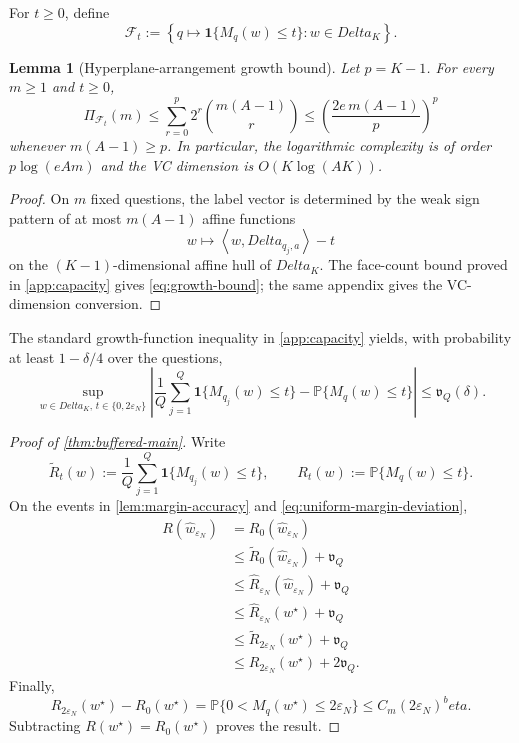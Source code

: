 \documentclass[11pt]{article}
\def\beta{beta}%
\def\Delta{Delta}%
\newtheorem{lemma}[theorem]{Lemma}
\newcommand{\Pp}{\mathbb P}
\newcommand{\one}{\mathbf 1}
\newcommand{\calF}{\mathcal F}
\newcommand{\eps}{\varepsilon}
\newcommand{\inner}[2]{\left\langle#1,#2\right\rangle}
\begin{document}
For $t\ge0$, define
\begin{equation}
\label{eq:margin-class}
\calF_t
:=
\left\{
q\mapsto\one\{M_q(w)\le t\}:w\in\Delta_K
\right\}.
\end{equation}

\begin{lemma}[Hyperplane-arrangement growth bound]
\label{lem:capacity}
Let $p=K-1$.  For every $m\ge1$ and $t\ge0$,
\begin{equation}
\label{eq:growth-bound}
\Pi_{\calF_t}(m)
\le
\sum_{r=0}^{p}2^r\binom{m(A-1)}{r}
\le
\left(\frac{2e\,m(A-1)}{p}\right)^p
\end{equation}
whenever $m(A-1)\ge p$.  In particular, the logarithmic complexity is of order $p\log(eAm)$ and the VC dimension is $O(K\log(AK))$.
\end{lemma}

\begin{proof}
On $m$ fixed questions, the label vector is determined by the weak sign pattern of at most $m(A-1)$ affine functions
\[
w\mapsto\inner{w}{\Delta_{q_j,a}}-t
\]
on the $(K-1)$-dimensional affine hull of $\Delta_K$.  The face-count bound proved in \cref{app:capacity} gives \eqref{eq:growth-bound}; the same appendix gives the VC-dimension conversion.
\end{proof}

The standard growth-function inequality in \cref{app:capacity} yields, with probability at least $1-\delta/4$ over the questions,
\begin{equation}
\label{eq:uniform-margin-deviation}
\sup_{w\in\Delta_K,\,t\in\{0,2\eps_N\}}
\left|
\frac1Q\sum_{j=1}^Q\one\{M_{q_j}(w)\le t\}
-
\Pp\{M_q(w)\le t\}
\right|
\le\mathfrak v_Q(\delta).
\end{equation}

\begin{proof}[Proof of \cref{thm:buffered-main}]
Write
\[
\widetilde R_t(w)
:=
\frac1Q\sum_{j=1}^Q\one\{M_{q_j}(w)\le t\},
\qquad
R_t(w)
:=
\Pp\{M_q(w)\le t\}.
\]
On the events in \cref{lem:margin-accuracy} and \eqref{eq:uniform-margin-deviation},
\begin{align*}
R(\widehat w_{\eps_N})
&=R_0(\widehat w_{\eps_N})\\
&\le\widetilde R_0(\widehat w_{\eps_N})+\mathfrak v_Q\\
&\le\widehat R_{\eps_N}(\widehat w_{\eps_N})+\mathfrak v_Q\\
&\le\widehat R_{\eps_N}(w^\star)+\mathfrak v_Q\\
&\le\widetilde R_{2\eps_N}(w^\star)+\mathfrak v_Q\\
&\le R_{2\eps_N}(w^\star)+2\mathfrak v_Q.
\end{align*}
Finally,
\[
R_{2\eps_N}(w^\star)-R_0(w^\star)
=
\Pp\{0<M_q(w^\star)\le2\eps_N\}
\le C_m(2\eps_N)^\beta.
\]
Subtracting $R(w^\star)=R_0(w^\star)$ proves the result.
\end{proof}
\end{document}
